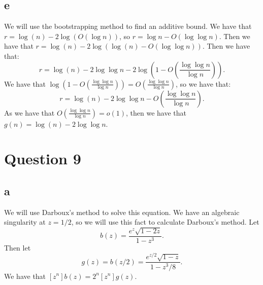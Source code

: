 \documentclass[]{article}
\theoremstyle{definition}
\numberwithin{theorem}{section}
\numberwithin{equation}{section}
\begin{document}
\subsection{e}
We will use the bootstrapping method to find an additive bound. 
We have that $r = \log(n) - 2 \log(O(\log n))$, so $r = \log n - O(\log \log n)$. Then we have that $r = \log(n) - 2 \log(\log (n) - O(\log \log n))$. Then we have that:
\begin{equation}
	r = \log(n) - 2 \log \log n - 2\log \left(1 -  O\left(\frac{\log \log n}{\log n}\right)\right).
\end{equation}
We have that $\log \left(1 -  O\left(\frac{\log \log n}{\log n}\right)\right) = O\left(\frac{\log \log n}{\log n}\right)$, so we have that:
\begin{equation}
	r = \log(n) - 2 \log \log n - O\left(\frac{\log \log n}{\log n}\right).
\end{equation}
As we have that $ O\left(\frac{\log \log n}{\log n}\right) = o(1)$, then we have that $g(n) = \log(n) - 2 \log \log n$. 
\section{Question 9}
\subsection{a}

We will use Darboux's method to solve this equation. We have an algebraic singularity at $z = 1/2$, so we will use this fact to calculate Darboux's method.
Let 
\begin{equation}
	b(z) = \frac{e^z \sqrt{1 - 2z}}{1 - z^3}.
\end{equation}
Then let 
\begin{equation}
	g(z) = b(z/2) = \frac{e^{z/2} \sqrt{1-z}}{1 - z^3/8}.
\end{equation}
We have that $[z^n] b(z) = 2^n [z^n] g(z)$. 
\end{document}
